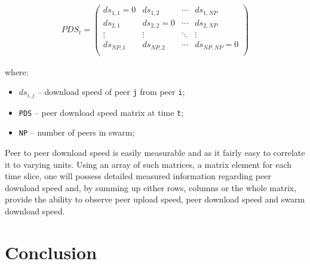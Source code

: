 \begin{align}
  PDS_{t} =
  \begin{pmatrix}
    ds_{1,1} = 0 & ds_{1,2} & \cdots & ds_{1,NP} \\
    ds_{2,1} & ds_{2,2} = 0 & \cdots & ds_{2,NP} \\
    \vdots & \vdots & \ddots & \vdots \\
    ds_{NP,1} & ds_{NP,2} & \cdots & ds_{NP,NP} = 0 \\
  \end{pmatrix}
\end{align}

where:

\begin{itemize}
  \item $ds_{i,j}$ -- download speed of peer \texttt{j} from peer \texttt{i};
  \item \texttt{PDS} -- peer download speed matrix at time \texttt{t};
  \item \texttt{NP} -- number of peers in swarm;
\end{itemize}

Peer to peer download speed is easily measurable and as it fairly easy to
correlate it to varying units. Using an array of such matrices, a matrix
element for each time slice, one will possess detailed measured information
regarding peer download speed and, by summing up either rows, columns or the
whole matrix, provide the ability to observe peer upload speed, peer download
speed and swarm download speed.

\section{Conclusion}
\label{sec:proto-measure:conclusion}

